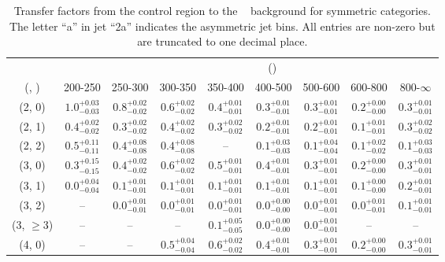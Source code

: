 \begin{table}[h!]
\tiny
\centering
\caption{Transfer factors from the \mj control region to the \zInv~ background for symmetric categories. The letter ``a'' in jet \eg ``2a''  indicates the asymmetric jet bins. All entries are non-zero but are truncated to one decimal place.\label{tab:tf_mu_zinv_sym}}
\begin{tabular}
{ccccccccc}
	\hline\hline
&	& \multicolumn{8}{c}{\scalht (\gev)} \\ 
	 (\njet,  \nb) & 200-250 & 250-300 & 300-350 & 350-400 & 400-500 & 500-600 & 600-800 & 800-$\infty$ \\ [0.8ex] 
\hline
	(2, 0) & $1.0^{+ 0.03 }_{- 0.03 }$ & $0.8^{+ 0.02 }_{- 0.02 }$ & $0.6^{+ 0.02 }_{- 0.02 }$ & $0.4^{+ 0.01 }_{- 0.01 }$ & $0.3^{+ 0.01 }_{- 0.01 }$ & $0.3^{+ 0.01 }_{- 0.01 }$ & $0.2^{+ 0.00 }_{- 0.00 }$ & $0.3^{+ 0.01 }_{- 0.01 }$ \\[0.5ex] 
	(2, 1) & $0.4^{+ 0.02 }_{- 0.02 }$ & $0.3^{+ 0.02 }_{- 0.02 }$ & $0.4^{+ 0.02 }_{- 0.02 }$ & $0.3^{+ 0.02 }_{- 0.02 }$ & $0.2^{+ 0.01 }_{- 0.01 }$ & $0.2^{+ 0.01 }_{- 0.01 }$ & $0.1^{+ 0.01 }_{- 0.01 }$ & $0.3^{+ 0.02 }_{- 0.02 }$ \\[0.5ex] 
	(2, 2) & $0.5^{+ 0.11 }_{- 0.11 }$ & $0.4^{+ 0.08 }_{- 0.08 }$ & $0.4^{+ 0.08 }_{- 0.08 }$ & -- & $0.1^{+ 0.03 }_{- 0.03 }$ & $0.1^{+ 0.04 }_{- 0.04 }$ & $0.1^{+ 0.02 }_{- 0.02 }$ & $0.1^{+ 0.03 }_{- 0.03 }$ \\[0.5ex] 
	(3, 0) & $0.3^{+ 0.15 }_{- 0.15 }$ & $0.4^{+ 0.02 }_{- 0.02 }$ & $0.6^{+ 0.02 }_{- 0.02 }$ & $0.5^{+ 0.01 }_{- 0.01 }$ & $0.4^{+ 0.01 }_{- 0.01 }$ & $0.3^{+ 0.01 }_{- 0.01 }$ & $0.2^{+ 0.00 }_{- 0.00 }$ & $0.3^{+ 0.01 }_{- 0.01 }$ \\[0.5ex] 
	(3, 1) & $0.0^{+ 0.04 }_{- 0.04 }$ & $0.1^{+ 0.01 }_{- 0.01 }$ & $0.1^{+ 0.01 }_{- 0.01 }$ & $0.1^{+ 0.01 }_{- 0.01 }$ & $0.1^{+ 0.01 }_{- 0.01 }$ & $0.1^{+ 0.01 }_{- 0.01 }$ & $0.1^{+ 0.00 }_{- 0.00 }$ & $0.2^{+ 0.01 }_{- 0.01 }$ \\[0.5ex] 
	(3, 2) & -- & $0.0^{+ 0.01 }_{- 0.01 }$ & $0.0^{+ 0.01 }_{- 0.01 }$ & $0.0^{+ 0.01 }_{- 0.01 }$ & $0.0^{+ 0.00 }_{- 0.00 }$ & $0.0^{+ 0.01 }_{- 0.01 }$ & $0.0^{+ 0.01 }_{- 0.01 }$ & $0.1^{+ 0.01 }_{- 0.01 }$ \\[0.5ex] 
	(3, $\ge3$) & -- & -- & -- & $0.1^{+ 0.05 }_{- 0.05 }$ & $0.0^{+ 0.00 }_{- 0.00 }$ & $0.0^{+ 0.01 }_{- 0.01 }$ & -- & -- \\[0.5ex] 
	(4, 0) & -- & -- & $0.5^{+ 0.04 }_{- 0.04 }$ & $0.6^{+ 0.02 }_{- 0.02 }$ & $0.4^{+ 0.01 }_{- 0.01 }$ & $0.3^{+ 0.01 }_{- 0.01 }$ & $0.2^{+ 0.00 }_{- 0.00 }$ & $0.3^{+ 0.01 }_{- 0.01 }$ \\[0.5ex] 

\end{tabular}
\end{table}
